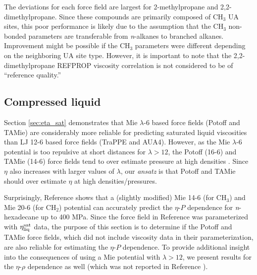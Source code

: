 \documentclass[preprint,review,12pt]{elsarticle}
\begin{document}
	
	The deviations for each force field are largest for 2-methylpropane and 2,2-dimethylpropane. Since these compounds are primarily composed of CH$_3$ UA sites, this poor performance is likely due to the assumption that the CH$_3$ non-bonded parameters are transferable from \textit{n}-alkanes to branched alkanes. Improvement might be possible if the CH$_3$ parameters were different depending on the neighboring UA site type. However, it is important to note that the 2,2-dimethylpropane REFPROP viscosity correlation is not considered to be of ``reference quality.''
	
	\subsection{Compressed liquid} \label{sec:T293highP}
	
	Section \ref{sec:eta_sat} demonstrates that Mie $\lambda$-6 based force fields (Potoff and TAMie) are considerably more reliable for predicting saturated liquid viscosities than LJ 12-6 based force fields (TraPPE and AUA4). However, as the Mie $\lambda$-6 potential is too repulsive at short distances for $\lambda > 12$, the Potoff (16-6) and TAMie (14-6) force fields tend to over estimate pressure at high densities \cite{Postdoc_2}. Since $\eta$ also increases with larger values of $\lambda$, our \textit{ansatz} is that Potoff and TAMie should over estimate $\eta$ at high densities/pressures. 
	
	Surprisingly, Reference  shows that a (slightly modified) Mie 14-6 (for CH$_3$) and Mie 20-6 (for CH$_2$) potential can accurately predict the $\eta$-$P$ dependence for \textit{n}-hexadecane up to 400 MPa. Since the force field in Reference  was parameterized with $\eta_{\rm liq}^{\rm sat}$ data, the purpose of this section is to determine if the Potoff and TAMie force fields, which did not include viscosity data in their parameterization, are also reliable for estimating the $\eta$-$P$ dependence. To provide additional insight into the consequences of using a Mie potential with $\lambda > 12$, we present results for the $\eta$-$\rho$ dependence as well (which was not reported in Reference ). 
	
	
\end{document}
